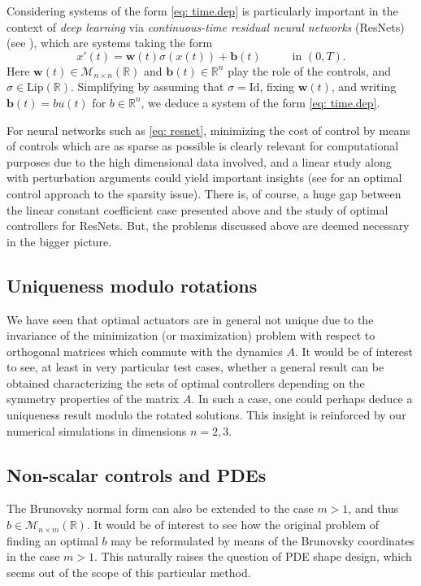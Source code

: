 \documentclass[journal,twoside,web]{ieeecolor}
\newcommand{\R}{\mathbb{R}}
\def\*#1{\mathbf{#1}}
\begin{document}
	Considering systems of the form \eqref{eq: time.dep} is particularly important in the context of \emph{deep learning} via \emph{continuous-time residual neural networks} (ResNets) (see \cite{weinan2017proposal, esteve2020large, ruiz2021neural, geshkovski2021control}), which are systems taking the form
	\begin{equation} \label{eq: resnet}
	x'(t) = \*w(t) \sigma(x(t)) + \*b(t) \hspace{1cm} \text{ in } (0,T).
	\end{equation}
	Here $\*w(t)\in\mathcal{M}_{n\times n}(\R)$ and $\*b(t)\in\R^n$ play the role of the controls, and $\sigma\in\mathrm{Lip}(\R)$. Simplifying by assuming that $\sigma=\text{Id}$, fixing $\*w(t)$, and writing $\*b(t)=bu(t)$ for $b\in\R^n$, we deduce a system of the form \eqref{eq: time.dep}. 
	
	For neural networks such as \eqref{eq: resnet}, minimizing the cost of control by means of controls which are as sparse as possible is clearly relevant for computational purposes due to the high dimensional data involved, and a linear study along with perturbation arguments could yield important insights (see \cite{yague2021sparse} for an optimal control approach to the sparsity issue). 
	There is, of course, a huge gap between the linear constant coefficient case presented above and the study of optimal controllers for ResNets. 
	But, the problems discussed above are deemed necessary in the bigger picture.
	
	\subsection{Uniqueness modulo rotations} We have seen that optimal actuators are in general not unique due to the invariance of the minimization (or maximization) problem with respect to orthogonal matrices which commute with the dynamics $A$. It would be of interest to see, at least in very particular test cases, whether a general result can be obtained characterizing the sets of optimal controllers depending on the symmetry properties of the matrix $A$. In such a case, one could perhaps deduce a uniqueness result modulo the rotated solutions. This insight is reinforced by our numerical simulations in dimensions $n=2,3$.
		
	\subsection{Non-scalar controls and PDEs} The Brunovsky normal form can also be extended to the case $m>1$, and thus $b \in \mathcal{M}_{n\times m}(\R)$. It would be of interest to see how the original problem of finding an optimal $b$  may be reformulated by means of the Brunovsky coordinates in the case $m>1$. This naturally raises the question of PDE shape design, which seems out of the scope of this particular method.
	
\end{document}
